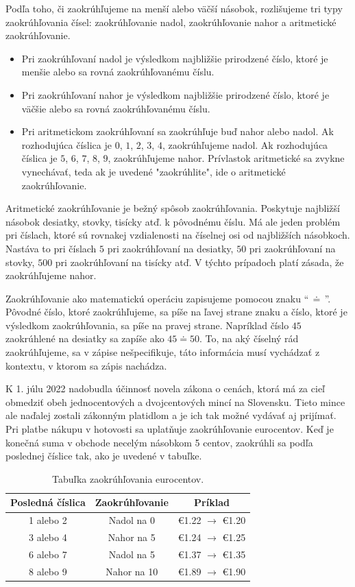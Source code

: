\documentclass{report}
\begin{document}
Podľa toho, či zaokrúhľujeme na menší alebo väčší násobok, rozlišujeme tri typy zaokrúhľovania čísel: zaokrúhľovanie nadol, zaokrúhľovanie nahor a aritmetické zaokrúhľovanie.
\begin{itemize}
  \item Pri zaokrúhľovaní nadol je výsledkom najbližšie prirodzené číslo, ktoré je menšie alebo sa rovná zaokrúhľovanému číslu.
  \item Pri zaokrúhľovaní nahor je výsledkom najbližšie prirodzené číslo, ktoré je väčšie alebo sa rovná zaokrúhľovanému číslu.
  \item Pri aritmetickom zaokrúhľovaní sa zaokrúhľuje buď nahor alebo nadol. Ak rozhodujúca číslica je \(0\), \(1\), \(2\), \(3\), \(4\), zaokrúhľujeme nadol. Ak rozhodujúca číslica je \(5\), \(6\), \(7\), \(8\), \(9\), zaokrúhľujeme nahor. Prívlastok aritmetické sa zvykne vynechávať, teda ak je uvedené "zaokrúhlite", ide o aritmetické zaokrúhľovanie.
\end{itemize}
Aritmetické zaokrúhľovanie je bežný spôsob zaokrúhľovania. Poskytuje najbližší násobok desiatky, stovky, tisícky atď. k pôvodnému číslu. Má ale jeden problém pri číslach, ktoré sú rovnakej vzdialenosti na číselnej osi od najbližších násobkoch. Nastáva to pri číslach \(5\) pri zaokrúhľovaní na desiatky, \(50\) pri zaokrúhľovaní na stovky, \(500\) pri zaokrúhľovaní na tisícky atď. V týchto prípadoch platí zásada, že zaokrúhľujeme nahor.

Zaokrúhľovanie ako matematickú operáciu zapisujeme pomocou znaku \enquote{\(\, \doteq \,\)}. Pôvodné číslo, ktoré zaokrúhľujeme, sa píše na ľavej strane znaku a číslo, ktoré je výsledkom zaokrúhľovania, sa píše na pravej strane. Napríklad číslo \(45\) zaokrúhlené na desiatky sa zapíše ako \(45 \doteq 50\). To, na aký číselný rád zaokrúhľujeme, sa v zápise nešpecifikuje, táto informácia musí vychádzať z kontextu, v ktorom sa zápis nachádza.

K 1. júlu 2022 nadobudla účinnosť novela zákona o cenách, ktorá má za cieľ obmedziť obeh jednocentových a dvojcentových mincí na Slovensku. Tieto mince ale naďalej zostali zákonným platidlom a je ich tak možné vydávať aj prijímať. Pri platbe nákupu v hotovosti sa uplatňuje zaokrúhľovanie eurocentov. Keď je konečná suma v obchode necelým násobkom 5 centov, zaokrúhli sa podľa poslednej číslice tak, ako je uvedené v tabuľke.

\begin{table}[H]
  \centering
  \renewcommand{\arraystretch}{1.3}
  \begin{tabular}{|c|c|c|}
    \hline
    Posledná číslica & Zaokrúhľovanie & Príklad \\
    \hline
    1 alebo 2 & Nadol na 0 & \euro 1.22 \(\rightarrow\) \euro 1.20 \\
    3 alebo 4 & Nahor na 5 & \euro 1.24 \(\rightarrow\) \euro 1.25 \\
    6 alebo 7 & Nadol na 5 & \euro 1.37 \(\rightarrow\) \euro 1.35 \\
    8 alebo 9 & Nahor na 10 & \euro 1.89 \(\rightarrow\) \euro 1.90 \\
    \hline
  \end{tabular}
  \caption{Tabuľka zaokrúhľovania eurocentov.}
\end{table}
\end{document}
